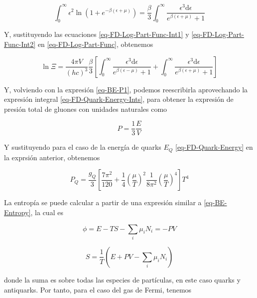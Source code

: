 \begin{equation}\label{eq-FD-Log-Part-Func-Int2}
\int_{0}^{\infty} {\epsilon}^{2} \ln \left(1 + {e}^{-\beta(\epsilon + \mu)} \right) = \frac{\beta}{3} \int_{0}^{\infty} \frac{{\epsilon}^{3} \mathrm{d} \epsilon}{{e}^{\beta (\epsilon + \mu)} + 1 }
\end{equation}

Y, sustituyendo las ecuaciones \eqref{eq-FD-Log-Part-Func-Int1} y  \eqref{eq-FD-Log-Part-Func-Int2} en \eqref{eq-FD-Log-Part-Func}, obtenemos 

\begin{equation}
\ln \Xi = \frac{4\pi V }{(hc)^{3}} \frac{\beta}{3} \left[\int_{0}^{\infty} \frac{{\epsilon}^{3} \mathrm{d} \epsilon}{{e}^{\beta (\epsilon - \mu)} + 1 } + \int_{0}^{\infty} \frac{{\epsilon}^{3} \mathrm{d} \epsilon}{{e}^{\beta (\epsilon + \mu)} + 1 }\right]
\end{equation}

Y, volviendo con la expresión \eqref{eq-BE-P1}, podemos reescribirla aprovechando la expresión integral \eqref{eq-FD-Quark-Energy-Ints}, para obtener la expresión de presión total de gluones con unidades naturales como

\begin{equation}
P = \frac{1}{3} \frac{E}{V}
\end{equation}

Y sustituyendo para el caso de la energía de quarks ${E}_{Q}$ \eqref{eq-FD-Quark-Energy} en la exprsión anterior, obtenemos

\begin{equation}\label{eq-FD-Quark-Pressure}
{P}_{Q} = \frac{{g}_{Q}}{3} \left[\frac{7 {\pi}^{2}}{120} + \frac{1}{4} \left(\frac{\mu}{T} \right)^{2} \frac{1}{8{\pi}^{2}} \left(\frac{\mu}{T} \right)^{4} \right] {T}^{4}
\end{equation}

La entropía se puede calcular a partir de una expresión similar a \eqref{eq-BE-Entropy}, la cual es

\begin{equation}
\phi = E -TS - \sum_{i}{\mu}_{i} {N}_{i} = - PV
\end{equation}

\begin{equation}
S = \frac{1}{T} \left(E + PV - \sum_{i} {\mu}_{i} {N}_{i} \right)
\end{equation}

donde la suma es sobre todas las especies de partículas, en este caso quarks y antiquarks. Por tanto, para el caso del gas de Fermi, tenemos 

